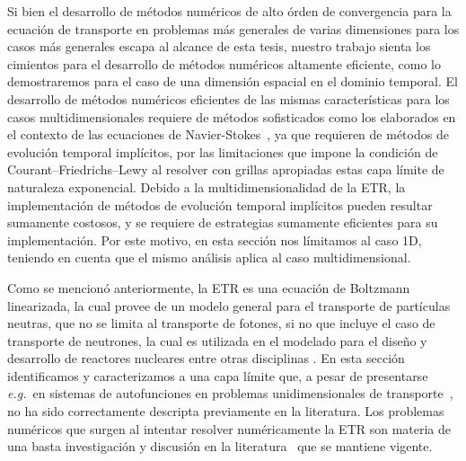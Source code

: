 Si bien el desarrollo de métodos numéricos de alto órden de 
convergencia para la ecuación de transporte en problemas más 
generales de varias dimensiones para los casos más generales 
escapa al alcance de esta tesis, nuestro trabajo 
sienta los cimientos para el desarrollo de métodos numéricos 
altamente eficiente, como lo demostraremos para el caso 
de una dimensión espacial en el dominio temporal. El desarrollo 
de métodos numéricos eficientes de las mismas características para los casos 
multidimensionales requiere de métodos sofisticados como 
los elaborados en el contexto de las ecuaciones de Navier-Stokes~\cite{Bruno2019}, 
ya que requieren de métodos de evolución temporal implícitos, por las limitaciones 
que impone la condición de Courant–Friedrichs–Lewy al resolver con grillas apropiadas 
estas capa límite de naturaleza exponencial. Debido a la multidimensionalidad 
de la ETR, la implementación de métodos de evolución temporal implícitos 
pueden resultar sumamente costosos, y se requiere de estrategias 
sumamente eficientes para su implementación. Por este motivo, 
en esta sección nos límitamos al caso 1D, teniendo en cuenta que el mismo 
análisis aplica al caso multidimensional. 


Como se mencionó anteriormente, la ETR es una ecuación de Boltzmann linearizada, 
la cual provee de un modelo general para el transporte de partículas neutras, 
que no se limita al transporte de fotones, si no que incluye el caso de 
transporte de neutrones, la cual es utilizada en el modelado 
para el diseño y desarrollo de reactores nucleares entre otras disciplinas 
\cite{Chandrasekhar1960,Case1967,Lewis1984,Petrovic1996,Hunter2015,Barichello2016,Hu2020}.  
En esta sección identificamos y caracterizamos a una capa límite 
que, a pesar de presentarse \textit{e.g.}~en sistemas de autofunciones 
en problemas unidimensionales de transporte~\cite[Cap. 4]{Case1967}, 
no ha sido correctamente descripta previamente en la literatura. 
Los problemas numéricos que surgen al intentar resolver 
numéricamente la ETR son materia de una basta investigación 
y discusión en la literatura~\cite{Case1967,Lewis1984,Petrovic1996,Bal2001,Hunter2015} 
que se mantiene vigente. 

